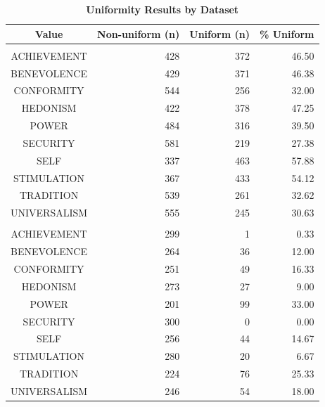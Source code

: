 \begin{table}[t]
\caption*{
{\large \textbf{Uniformity Results by Dataset}}
} 
\fontsize{12.0pt}{14.4pt}\selectfont
\begin{tabular*}{\linewidth}{@{\extracolsep{\fill}}crrr}
\toprule
Value & Non-uniform (n) & Uniform (n) & \% Uniform \\ 
\midrule\addlinespace[2.5pt]
\multicolumn{4}{l}{Lyrics} \\[2.5pt] 
\midrule\addlinespace[2.5pt]
ACHIEVEMENT & 428 & 372 & 46.50 \\ 
BENEVOLENCE & 429 & 371 & 46.38 \\ 
CONFORMITY & 544 & 256 & 32.00 \\ 
HEDONISM & 422 & 378 & 47.25 \\ 
POWER & 484 & 316 & 39.50 \\ 
SECURITY & 581 & 219 & 27.38 \\ 
SELF & 337 & 463 & 57.88 \\ 
STIMULATION & 367 & 433 & 54.12 \\ 
TRADITION & 539 & 261 & 32.62 \\ 
UNIVERSALISM & 555 & 245 & 30.63 \\ 
\midrule\addlinespace[2.5pt]
\multicolumn{4}{l}{Speeches} \\[2.5pt] 
\midrule\addlinespace[2.5pt]
ACHIEVEMENT & 299 & 1 & 0.33 \\ 
BENEVOLENCE & 264 & 36 & 12.00 \\ 
CONFORMITY & 251 & 49 & 16.33 \\ 
HEDONISM & 273 & 27 & 9.00 \\ 
POWER & 201 & 99 & 33.00 \\ 
SECURITY & 300 & 0 & 0.00 \\ 
SELF & 256 & 44 & 14.67 \\ 
STIMULATION & 280 & 20 & 6.67 \\ 
TRADITION & 224 & 76 & 25.33 \\ 
UNIVERSALISM & 246 & 54 & 18.00 \\ 
\bottomrule
\end{tabular*}
\end{table}

